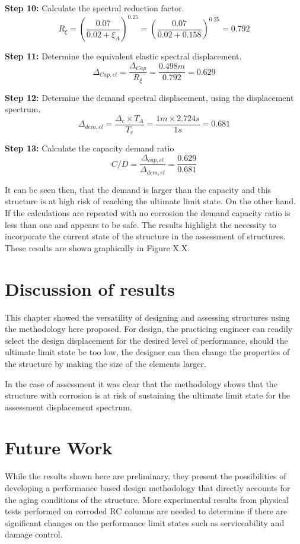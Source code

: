 \textbf{Step 10:} Calculate the spectral reduction factor.
\begin{displaymath}
     R_{\xi}=\left(\frac{0.07}{0.02+\xi_{A}}\right)^{0.25}=\left(\frac{0.07}{0.02+0.158}\right)^{0.25}=0.792
\end{displaymath}

\textbf{Step 11:} Determine the equivalent elastic spectral displacement.
\begin{displaymath}
     \Delta_{Cap,el}=\frac{\Delta_{Cap}}{R_{\xi}}=\frac{0.498m}{0.792}=0.629
\end{displaymath}

\textbf{Step 12:} Determine the demand spectral displacement, using the displacement spectrum.
\begin{displaymath}
     \Delta_{dem,el}=\frac{\Delta_{c} \times T_{A}}{T_{c}}=\frac{1m \times 2.724s}{1s}=0.681
\end{displaymath}

\textbf{Step 13:} Calculate the capacity demand ratio
\begin{displaymath}
     C/D= \frac{\Delta_{cap,el}}{\Delta_{dem,el}}= \frac{0.629}{0.681}
\end{displaymath}

It can be seen then, that the demand is larger than the capacity and this structure is at high risk of reaching the ultimate limit state. On the other hand. If the calculations are repeated with no corrosion the demand capacity ratio is less than one and appears to be safe. The results highlight the necessity to incorporate the current state of the structure in the assessment of structures. These results are shown graphically in Figure X.X.

\section{Discussion of results}

This chapter showed the versatility of designing and assessing structures using the methodology here proposed. For design, the practicing engineer can readily select the design displacement for the desired level of performance, should the ultimate limit state be too low, the designer can then change the properties of the structure by making the size of the elements larger. 

In the case of assessment it was clear that the methodology shows that the structure with corrosion is at risk of sustaining the ultimate limit state for the assessment displacement spectrum.

\section{Future Work}

While the results shown here are preliminary, they present the possibilities of developing a performance based design methodology that directly accounts for the aging conditions of the structure. More experimental results from physical tests performed on corroded RC columns are needed to determine if there are significant changes on the performance limit states such as serviceability and damage control.